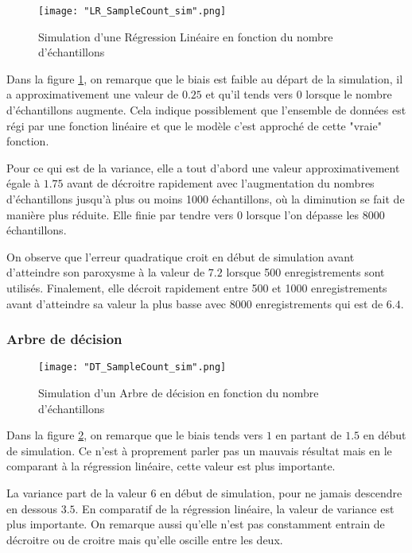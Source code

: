 \documentclass[a4paper]{article}
\begin{document}
\begin{figure}[!h]
	\centering
	\texttt{[image: "LR\_SampleCount\_sim".png]}
	\caption{Simulation d'une Régression Linéaire en fonction du nombre d'échantillons}
	\label{LR_SampleCount}
\end{figure}

Dans la figure \ref{LR_SampleCount}, on remarque que le biais est faible au départ de la simulation, il a approximativement une valeur de $0.25$ et qu'il tends vers $0$ lorsque le nombre d'échantillons augmente. Cela indique possiblement que l'ensemble de données est régi par une fonction linéaire et que le modèle c'est approché de cette "vraie" fonction.\newline

Pour ce qui est de la variance, elle a tout d'abord une valeur approximativement égale à $1.75$ avant de décroitre rapidement avec l'augmentation du nombres d'échantillons jusqu'à plus ou moins 1000 échantillons, où la diminution se fait de manière plus réduite. Elle finie par tendre vers $0$ lorsque l'on dépasse les 8000 échantillons. \newline

On observe que l'erreur quadratique croit en début de simulation avant d'atteindre son paroxysme à la valeur de $7.2$ lorsque 500 enregistrements sont utilisés. Finalement, elle décroit rapidement entre 500 et 1000 enregistrements avant d'atteindre sa valeur la plus basse avec 8000 enregistrements qui est de $6.4$.

\newpage

\subsubsection{Arbre de décision}

\begin{figure}[!h]
	\centering
	\texttt{[image: "DT\_SampleCount\_sim".png]}
	\caption{Simulation d'un Arbre de décision en fonction du nombre d'échantillons}
	\label{DT_SampleCount}
\end{figure}

Dans la figure \ref{DT_SampleCount}, on remarque que le biais tends vers $1$ en partant de $1.5$ en début de simulation. Ce n'est à proprement parler pas un mauvais résultat mais en le comparant à la régression linéaire, cette valeur est plus importante. \newline

La variance part de la valeur $6$ en début de simulation, pour ne jamais descendre en dessous $3.5$. En comparatif de la régression linéaire, la valeur de variance est plus importante. On remarque aussi qu'elle n'est pas constamment entrain de décroitre ou de croitre mais qu'elle oscille entre les deux. \newline
\end{document}
